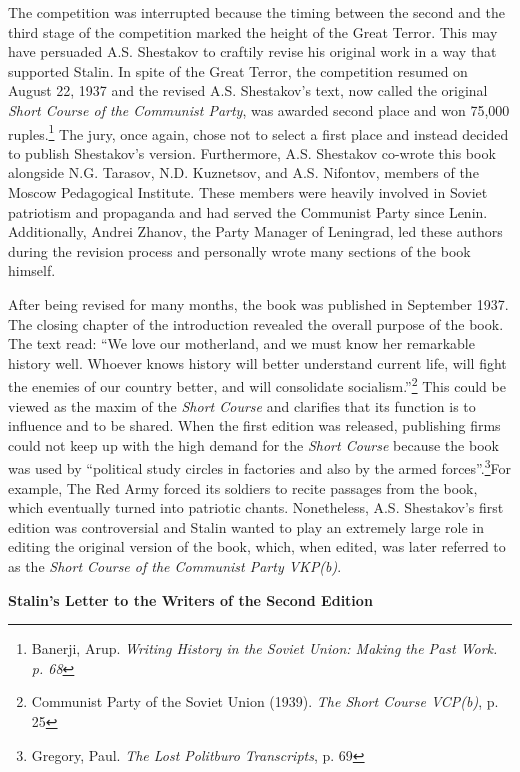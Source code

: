 \documentclass[a4paper, twocolumn]{article}
\begin{document}
The competition was interrupted because the timing between the second
and the third stage of the competition marked the height of the Great
Terror. This may have persuaded A.S. Shestakov to craftily revise his
original work in a way that supported Stalin. In spite of the Great
Terror, the competition resumed on August 22, 1937 and the revised
A.S. Shestakov's text, now called the original \emph{Short Course of the
Communist Party}, was awarded second place and won 75,000 ruples.\footnote{Banerji, Arup. \emph{Writing History in the Soviet Union: Making the Past Work. p.  68}}
The jury, once again, chose not to select a first place and instead
decided to publish Shestakov's version. Furthermore, A.S. Shestakov
co-wrote this book alongside N.G. Tarasov, N.D. Kuznetsov, and
A.S. Nifontov, members of the Moscow Pedagogical Institute. These
members were heavily involved in Soviet patriotism and propaganda and
had served the Communist Party since Lenin. Additionally, Andrei
Zhanov, the Party Manager of Leningrad, led these authors during the
revision process and personally wrote many sections of the book
himself.

After being revised for many months, the book was published in
September 1937.  The closing chapter of the introduction revealed the
overall purpose of the book.  The text read: ``We love our motherland,
and we must know her remarkable history well. Whoever knows history
will better understand current life, will fight the enemies of our
country better, and will consolidate socialism.''\footnote{Communist Party of the Soviet Union (1939). \emph{The Short Course VCP(b)}, p. 25} This could be
viewed as the maxim of the \emph{Short Course} and clarifies that its
function is to influence and to be shared. When the first edition was
released, publishing firms could not keep up with the high demand for
the \emph{Short Course} because the book was used by “political study circles
in factories and also by the armed forces”.\footnote{Gregory, Paul. \emph{The Lost Politburo Transcripts}, p. 69}For example, The Red
Army forced its soldiers to recite passages from the book, which
eventually turned into patriotic chants. Nonetheless, A.S. Shestakov's
first edition was controversial and Stalin wanted to play an extremely
large role in editing the original version of the book, which, when
edited, was later referred to as the \emph{Short Course of the Communist
Party VKP(b)}.


\begin{center}\textbf{Stalin's Letter to the Writers of the Second Edition}\end{center}
\end{document}
